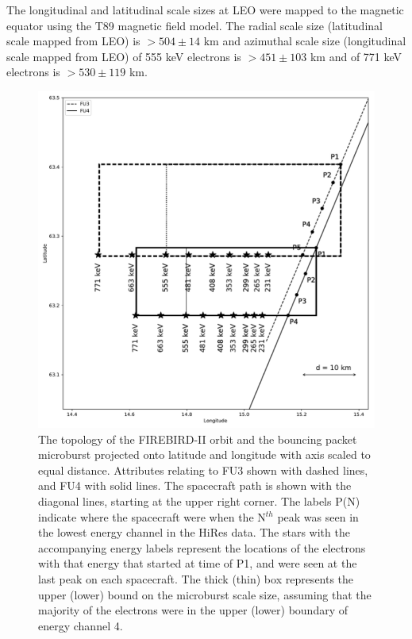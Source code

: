 \documentclass[draft,linenumbers]{agujournal}
\begin{document}
The longitudinal and latitudinal scale sizes at LEO were mapped to the magnetic equator using the T89 magnetic field model. The radial scale size (latitudinal scale mapped from LEO) is $> 504 \pm​ 14$ km and azimuthal scale size (longitudinal scale mapped from LEO) of 555 keV electrons is $> 451 \pm 103$ km and of 771 keV electrons is $> 530 \pm 119$ km.

\begin{figure}
\includegraphics[width=\textwidth]{decay_microburst_distance_corrected_CH4_last_pk_drift.pdf}
\caption{The topology of the FIREBIRD-II orbit and the bouncing packet microburst projected onto latitude and longitude with axis scaled to equal distance. Attributes relating to FU3 shown with dashed lines, and FU4 with solid lines. The spacecraft path is shown with the diagonal lines, starting at the upper right corner. The labels P(N) indicate where the spacecraft were when the N$^{th}$ peak was seen in the lowest energy channel in the HiRes data. The stars with the accompanying energy labels represent the locations of the electrons with that energy that started at time of P1, and were seen at the last peak on each spacecraft. The thick (thin) box represents the upper (lower) bound on the microburst scale size, assuming that the majority of the electrons were in the upper (lower) boundary of energy channel 4.}
\label{map_plot}
\end{figure}
\end{document}
